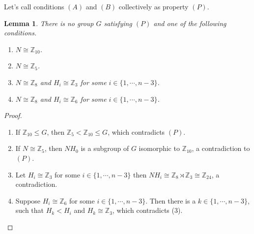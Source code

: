 \documentclass[a4paper,11pt]{amsart}
\numberwithin{equation}{section}
\numberwithin{equation}{subsection}
\newtheorem{lemma}[theorem]{Lemma}
\begin{document}
Let's call conditions $(A)$ and $(B)$ collectively as property $(P)$.
\begin{lemma}\label{lemma1}
   There is no group $G$ satisfying $(P)$ and one of the following conditions.
   \begin{enumerate}
       \item  $N \cong \mathbb{Z}_{10}$.

       \item $N \cong \mathbb{Z}_{5}$. 

        \item $N \cong \mathbb{Z}_{8}$ and $H_i \cong \mathbb{Z}_{3}$ for some $i\in \{1,\cdots,n-3\}$.

        \item $N \cong \mathbb{Z}_8$ and $H_i \cong \mathbb{Z}_{6}$ for some $i\in \{1,\cdots,n-3\}$.

         
   \end{enumerate}
\end{lemma}
\begin{proof}
\begin{enumerate}
    \item If $\mathbb{Z}_{10} \leq G$, then $\mathbb{Z}_5<\mathbb{Z}_{10}\leq G$, which contradicts $(P)$.
    
    \item If $N\cong \mathbb{Z}_{5}$, then $NH_{0}$ is a subgroup of $G$ isomorphic to $\mathbb{Z}_{10}$, a contradiction to $(P)$.

     \item  Let $H_{i}\cong \mathbb{Z}_{3}$ for some $i \in \{1,\cdots, n-3\}$ then $NH_{i}\cong \mathbb{Z}_{8}\rtimes \mathbb{Z}_{3} \cong \mathbb{Z}_{24}$, a contradiction.
    \item Suppose $H_{i}\cong \mathbb{Z}_{6}$ for some $i \in \{1,\cdots,n-3\} $. Then there is a $k \in \{1,\cdots,n-3\}$, such that $H_k < H_i$ and $H_{k}  \cong \mathbb{Z}_{3}$, which contradicts (3).
\end{enumerate}
\end{proof}
\end{document}
